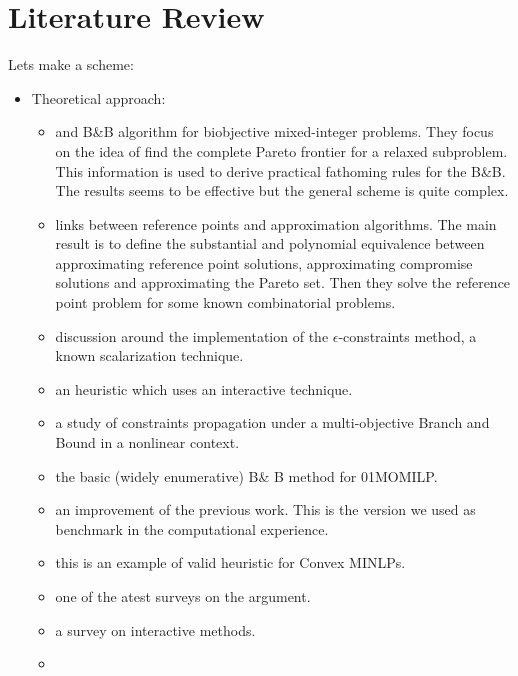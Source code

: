 \documentclass{article}
\begin{document}
    \section{Literature Review}
    Lets make a scheme:  
    \begin{itemize}
    	\item Theoretical approach:
    	\begin{itemize}
    			\item \cite{the:belotti2013branch}
    			and  \cite{the:belotti2016fathoming}  B\&B algorithm for biobjective mixed-integer problems.
    			They focus on the idea of find the complete Pareto frontier for a relaxed subproblem. This information is used to derive practical fathoming rules for the B\&B.
    		    The results seems to be effective but the general scheme is quite complex.
    			\item \cite{the:busing2017reference} links between reference points and approximation algorithms.  The main result is to define the substantial and polynomial equivalence between  approximating reference point solutions, approximating compromise solutions and approximating the Pareto
    			set. Then they solve the reference point problem for some known combinatorial problems.
    			\item \cite{the:e-constraints:mavrotas2009effective} discussion around the implementation of the $\epsilon$-constraints method, a known scalarization technique.
    			\item \cite{the:gabbani1986interactive} an heuristic which uses an interactive technique. 
    			\item
    			\cite{the:martin2017constraint} a study of constraints propagation under a multi-objective Branch and Bound in a nonlinear context.
    			\item \cite{the:mavrotas1998branch}
    			the basic (widely enumerative) B\& B method for 01MOMILP. 
    			\item \cite{the:mavrotas2005multi}
    			an improvement of the previous work. This is the version we used as benchmark in the computational experience. 
    			\item \cite{the:nonlin:conv:cacchiani2017branch} this is an example of valid heuristic for Convex MINLPs.
    			\item  \cite{the:przybylski2017multi} one of the atest surveys on the argument.
    			\item \cite{surv:alves2007review} a survey on interactive methods.
    			\item

\end{itemize}
\end{itemize}
\end{document}
